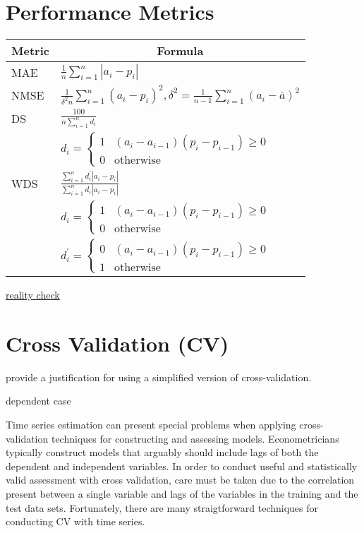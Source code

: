 \documentclass[12pt]{article}
\begin{document}
\section{Performance Metrics}

\cite{e.h01:_applic}

{\large
\begin{tabular}{|l|l|}
  \hline
\multicolumn{1}{|c|}{Metric}&\multicolumn{1}{|c|}{Formula}\\
  \hline
MAE&$\frac{1}{n}\sum_{i=1}^n | a_i-p_i|$\\
  \hline
NMSE&$\frac{1}{\delta^2n}\sum_{i=1}^n (a_i-p_i)^2, \delta^2=\frac{1}{n-1}\sum_{i=1}^n(a_i-\bar{a})^2$\\
  \hline
DS&{\Large $\frac{100}{n \sum_{i=1}^n d_i}$}\\
& $d_i=
    \begin{cases}
      1&(a_i-a_{i-1})(p_i-p_{i-1}) \ge 0\\
      0&\text{otherwise}
    \end{cases}$\\
  \hline
WDS&{\Large $\frac{\sum_{i=1}^n d^\prime_i|a_i-p_i|}{\sum_{i=1}^n d_i|a_i-p_i|}$}\\
&$ d_i=
    \begin{cases}
      1&(a_i-a_{i-1})(p_i-p_{i-1}) \ge 0\\
      0&\text{otherwise}
    \end{cases}$\\
&$ d_i^\prime=
    \begin{cases}
      0&(a_i-a_{i-1})(p_i-p_{i-1}) \ge 0\\
      1&\text{otherwise}
    \end{cases}$\\
  \hline
\end{tabular}
}
\href{http://numericalmethod.com/blog/2011/07/28/on-whites-2000-reality-check/}{reality check}

\section{Cross Validation (CV)}

\cite{bergmeir15:_note} provide a justification for using a simplified version of cross-validation.


\cite{conf/icann/LendasseWV03}  \cite{kreiss12}

dependent case \cite{racine00:_consis}


Time series estimation can present special problems 
when applying cross-validation techniques for  constructing and
assessing models. 
Econometricians typically construct 
models that arguably should include
lags of both the dependent and independent variables.
In order to conduct  useful and statistically valid assessment
with cross validation, 
care must be taken due to the correlation present between a 
single variable and lags of the variables in the training and the test
data sets.
Fortunately,  there are many straigtforward techniques for conducting CV 
with time series.
\end{document}
